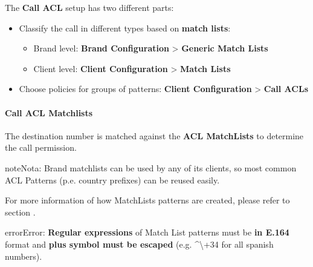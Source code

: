 \documentclass[letterpaper,10pt,spanish]{sphinxmanual}
\begin{document}
The \textbf{Call ACL} setup has two different parts:
\begin{itemize}
\item {} 
Classify the call in different types based on \textbf{match lists}:
\begin{itemize}
\item {} 
Brand level: \textbf{Brand Configuration} \textgreater{} \textbf{Generic Match Lists}

\item {} 
Client level: \textbf{Client Configuration} \textgreater{} \textbf{Match Lists}

\end{itemize}

\item {} 
Choose policies for groups of patterns: \textbf{Client Configuration} \textgreater{} \textbf{Call
ACLs}

\end{itemize}


\paragraph{Call ACL Matchlists}
\label{administration_portal/client/vpbx/user_configuration/call_acls:call-acl-matchlists}
The destination number is matched against the \textbf{ACL MatchLists} to determine
the call permission.

\begin{notice}{note}{Nota:}
Brand matchlists can be used by any of its clients, so most common
ACL Patterns (p.e. country prefixes) can be reused easily.
\end{notice}

For more information of how MatchLists patterns are created, please refer to section
{\hyperref[administration_portal/client/vpbx/routing_tools/match_lists:match\string-lists]{}}.

\begin{notice}{error}{Error:}
\textbf{Regular expressions} of Match List patterns must be \textbf{in E.164} format and \textbf{plus symbol must be
escaped} (e.g. \textasciicircum{}\textbackslash{}+34 for all spanish numbers).
\end{notice}
\end{document}
